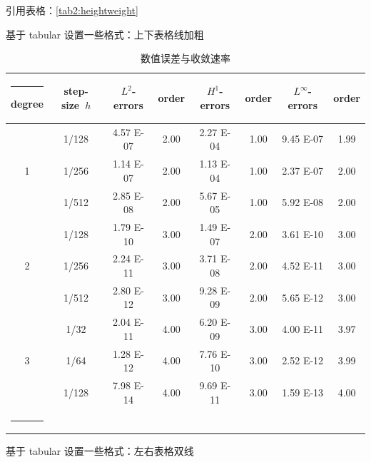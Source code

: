 \documentclass{shnuthesis}
\begin{document}
引用表格：\autoref{tab2:heightweight} 

\clearpage
基于 tabular 设置一些格式：上下表格线加粗

\begin{table}[!htp]
\centering
\caption{数值误差与收敛速率}
\renewcommand\arraystretch{1.2} %
\makeatletter
\def\hlinew#1{\noalign{\ifnum0=`}\fi\hrule \@height #1 \futurelet\reserved@a\@xhline}
\makeatother
\label{table1}
\begin{tabular}{c|c|cc|cc|cc}
\hlinew{0.9pt}  %
degree &  step-size~$h$  & $L^2$-errors  &  order  & $H^1$-errors & order & $L^\infty$-errors  &  order \\
\hline
   &  1/128     & 4.57 E-07    &2.00     & 2.27 E-04  &1.00          & 9.45 E-07   &1.99    \\
1  &  1/256    & 1.14 E-07     &2.00    & 1.13 E-04  &1.00          & 2.37 E-07   &2.00      \\
   &  1/512    & 2.85 E-08     &2.00    & 5.67 E-05  &1.00          & 5.92 E-08   &2.00       \\
\hline  %
   &  1/128    & 1.79 E-10    &3.00      & 1.49 E-07  &2.00            & 3.61 E-10  &3.00       \\
2  &  1/256     & 2.24 E-11     &3.00       & 3.71 E-08  &2.00         & 4.52 E-11   &3.00      \\
   &  1/512     & 2.80 E-12     &3.00       & 9.28 E-09  &2.00        & 5.65 E-12   &3.00     \\
\hline  %
   &  1/32      & 2.04 E-11    &4.00      & 6.20 E-09  &3.00           & 4.00 E-11   &3.97       \\
3  &  1/64     & 1.28 E-12     &4.00     & 7.76 E-10  &3.00           & 2.52 E-12   &3.99       \\
   &  1/128     & 7.98 E-14     &4.00     & 9.69 E-11  &3.00           & 1.59 E-13   &4.00       \\
\hlinew{0.9pt}
\end{tabular}
\end{table}


基于 tabular 设置一些格式：左右表格双线
\end{document}
